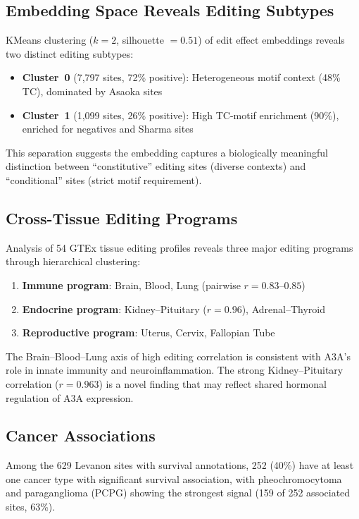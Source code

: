 \documentclass[11pt]{article}
\begin{document}
\subsection{Embedding Space Reveals Editing Subtypes}

KMeans clustering ($k=2$, silhouette $= 0.51$) of edit effect embeddings
reveals two distinct editing subtypes:
\begin{itemize}
  \item \textbf{Cluster~0} (7,797 sites, 72\% positive): Heterogeneous motif
    context (48\% TC), dominated by Asaoka sites
  \item \textbf{Cluster~1} (1,099 sites, 26\% positive): High TC-motif
    enrichment (90\%), enriched for negatives and Sharma sites
\end{itemize}

This separation suggests the embedding captures a biologically meaningful
distinction between ``constitutive'' editing sites (diverse contexts) and
``conditional'' sites (strict motif requirement).

\subsection{Cross-Tissue Editing Programs}

Analysis of 54 GTEx tissue editing profiles reveals three major editing
programs through hierarchical clustering:
\begin{enumerate}
  \item \textbf{Immune program}: Brain, Blood, Lung (pairwise $r = 0.83$--$0.85$)
  \item \textbf{Endocrine program}: Kidney--Pituitary ($r = 0.96$), Adrenal--Thyroid
  \item \textbf{Reproductive program}: Uterus, Cervix, Fallopian Tube
\end{enumerate}

The Brain--Blood--Lung axis of high editing correlation is consistent with
A3A's role in innate immunity and neuroinflammation. The strong
Kidney--Pituitary correlation ($r = 0.963$) is a novel finding that may
reflect shared hormonal regulation of A3A expression.

\subsection{Cancer Associations}

Among the 629 Levanon sites with survival annotations, 252 (40\%) have at
least one cancer type with significant survival association, with
pheochromocytoma and paraganglioma (PCPG) showing the strongest signal
(159 of 252 associated sites, 63\%).
\end{document}
